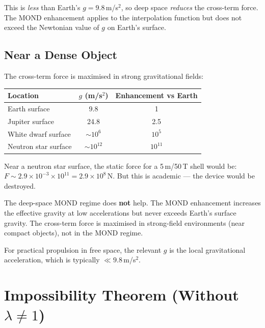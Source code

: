 \documentclass[11pt]{article}
\begin{document}
This is \textit{less} than Earth's $g = 9.8$\,m/s$^2$, so deep space
\textit{reduces} the cross-term force. The MOND enhancement applies to
the interpolation function but does not exceed the Newtonian value
of $g$ on Earth's surface.

\subsection{Near a Dense Object}

The cross-term force is maximised in strong gravitational fields:
\begin{center}
\begin{tabular}{lcc}
\toprule
Location & $g$ (m/s$^2$) & Enhancement vs Earth \\
\midrule
Earth surface & 9.8 & 1 \\
Jupiter surface & 24.8 & 2.5 \\
White dwarf surface & $\sim 10^6$ & $10^5$ \\
Neutron star surface & $\sim 10^{12}$ & $10^{11}$ \\
\bottomrule
\end{tabular}
\end{center}

Near a neutron star surface, the static force for a 5\,m/50\,T shell would be:
$F \sim 2.9 \times 10^{-3} \times 10^{11} = 2.9 \times 10^8$\,N.
But this is academic --- the device would be destroyed.

\begin{tcolorbox}[colback=red!5!white, colframe=red!50!black,
  title=MOND Regime Verdict]
The deep-space MOND regime does \textbf{not} help. The MOND enhancement
increases the effective gravity at low accelerations but never exceeds
Earth's surface gravity. The cross-term force is maximised in strong-field
environments (near compact objects), not in the MOND regime.

For practical propulsion in free space, the relevant $g$ is the local
gravitational acceleration, which is typically $\ll 9.8$\,m/s$^2$.
\end{tcolorbox}


\section{Impossibility Theorem (Without $\lambda \neq 1$)}\label{sec:impossibility}
\end{document}
